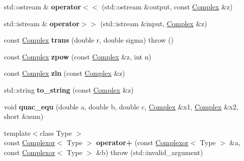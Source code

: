 \begin{DoxyCompactItemize}
std\+::ostream \& {\bfseries operator$<$$<$} (std\+::ostream \&output, const \hyperlink{classkerbal_1_1math_1_1_complex}{Complex} \&z)
\item 
\mbox{\label{namespacekerbal_1_1math_a4e6bb2ef54f405dac56a8354b7ce0f60}} 
std\+::istream \& {\bfseries operator$>$$>$} (std\+::istream \&input, \hyperlink{classkerbal_1_1math_1_1_complex}{Complex} \&z)
\item 
\mbox{\label{namespacekerbal_1_1math_a84b12f9a7498fc9847ad98b1b57b2b07}} 
const \hyperlink{classkerbal_1_1math_1_1_complex}{Complex} {\bfseries trans} (double r, double sigma)  throw ()
\item 
\mbox{\label{namespacekerbal_1_1math_a9d3e5e34466c94275df6bdd69e9c8d46}} 
const \hyperlink{classkerbal_1_1math_1_1_complex}{Complex} {\bfseries zpow} (const \hyperlink{classkerbal_1_1math_1_1_complex}{Complex} \&z, int n)
\item 
\mbox{\label{namespacekerbal_1_1math_ac3c134bedbb06b71ca296e963557a037}} 
const \hyperlink{classkerbal_1_1math_1_1_complex}{Complex} {\bfseries zln} (const \hyperlink{classkerbal_1_1math_1_1_complex}{Complex} \&z)
\item 
\mbox{\label{namespacekerbal_1_1math_a1e1c6d873112ab5db97bdab6d63d11c0}} 
std\+::string {\bfseries to\+\_\+string} (const \hyperlink{classkerbal_1_1math_1_1_complex}{Complex} \&z)
\item 
\mbox{\label{namespacekerbal_1_1math_a15674517c0b156beb8bd1b2beef6070e}} 
void {\bfseries quac\+\_\+equ} (double a, double b, double c, \hyperlink{classkerbal_1_1math_1_1_complex}{Complex} \&x1, \hyperlink{classkerbal_1_1math_1_1_complex}{Complex} \&x2, short \&num)
\item 
\mbox{\label{namespacekerbal_1_1math_aedf0717f5b37cdc5180719573456aed1}} 
{\footnotesize template$<$class Type $>$ }\\const \hyperlink{classkerbal_1_1math_1_1_complexor}{Complexor}$<$ Type $>$ {\bfseries operator+} (const \hyperlink{classkerbal_1_1math_1_1_complexor}{Complexor}$<$ Type $>$ \&a, const \hyperlink{classkerbal_1_1math_1_1_complexor}{Complexor}$<$ Type $>$ \&b)  throw (std\+::invalid\+\_\+argument)

\end{DoxyCompactItemize}

